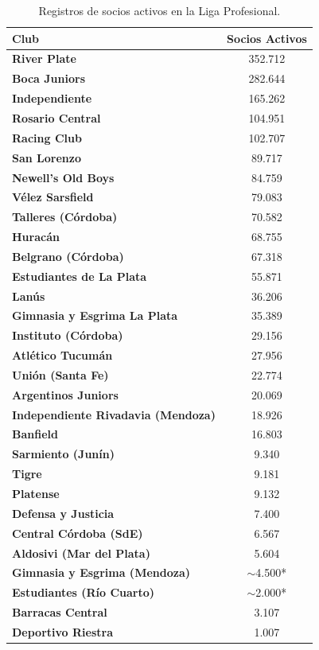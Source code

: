 \begin{table}[h!]
\centering
\renewcommand{\arraystretch}{1.1}
\begin{tabularx}{\textwidth}{|X|c|}
\hline
\rowcolor{gray!20} \textbf{Club} & \textbf{Socios Activos} \\ \hline
\textbf{River Plate} & 352.712 \\ \hline
\textbf{Boca Juniors} & 282.644 \\ \hline
\textbf{Independiente} & 165.262 \\ \hline
\textbf{Rosario Central} & 104.951 \\ \hline
\textbf{Racing Club} & 102.707 \\ \hline
\textbf{San Lorenzo} & 89.717 \\ \hline
\textbf{Newell's Old Boys} & 84.759 \\ \hline
\textbf{Vélez Sarsfield} & 79.083 \\ \hline
\textbf{Talleres (Córdoba)} & 70.582 \\ \hline
\textbf{Huracán} & 68.755 \\ \hline
\textbf{Belgrano (Córdoba)} & 67.318 \\ \hline
\textbf{Estudiantes de La Plata} & 55.871 \\ \hline
\textbf{Lanús} & 36.206 \\ \hline
\textbf{Gimnasia y Esgrima La Plata} & 35.389 \\ \hline
\textbf{Instituto (Córdoba)} & 29.156 \\ \hline
\textbf{Atlético Tucumán} & 27.956 \\ \hline
\textbf{Unión (Santa Fe)} & 22.774 \\ \hline
\textbf{Argentinos Juniors} & 20.069 \\ \hline
\textbf{Independiente Rivadavia (Mendoza)} & 18.926 \\ \hline
\textbf{Banfield} & 16.803 \\ \hline
\textbf{Sarmiento (Junín)} & 9.340 \\ \hline
\textbf{Tigre} & 9.181 \\ \hline
\textbf{Platense} & 9.132 \\ \hline
\textbf{Defensa y Justicia} & 7.400 \\ \hline
\textbf{Central Córdoba (SdE)} & 6.567 \\ \hline
\textbf{Aldosivi (Mar del Plata)} & 5.604 \\ \hline
\textbf{Gimnasia y Esgrima (Mendoza)} & $\sim$4.500* \\ \hline
\textbf{Estudiantes (Río Cuarto)} & $\sim$2.000* \\ \hline
\textbf{Barracas Central} & 3.107 \\ \hline
\textbf{Deportivo Riestra} & 1.007 \\ \hline
\end{tabularx}
\caption{Registros de socios activos en la Liga Profesional.}
\label{tab:anexo_liga_profesional}
\end{table}

